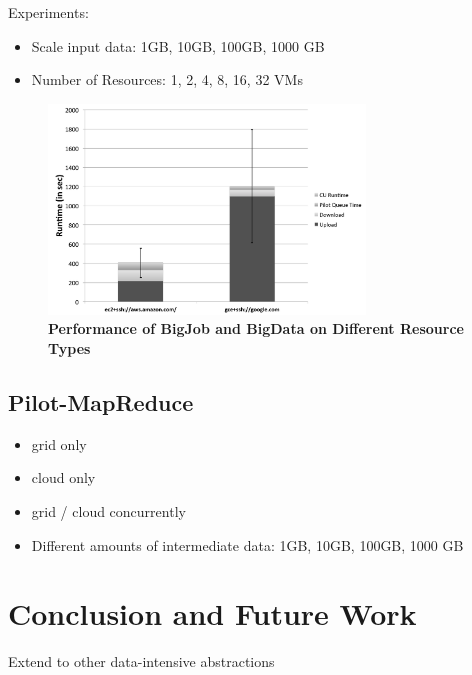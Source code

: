 \documentclass[times]{cpeauth}
\begin{document}
Experiments:
\begin{itemize}
	\item  Scale input data: 1GB, 10GB, 100GB, 1000 GB
	\item  Number of Resources: 1, 2, 4, 8, 16, 32 VMs
\end{itemize}


\begin{figure}[htbp]
	\centering
		\includegraphics[width=0.75\textwidth]{performance/pd_google_aws.pdf}
	\caption{\textbf{Performance of BigJob and BigData on Different Resource Types}}
	\label{fig:performance_pd_google_aws}
\end{figure}




\subsection{Pilot-MapReduce}
\begin{itemize}
	\item grid only
	\item cloud only
	\item grid / cloud concurrently
	\item  Different amounts of intermediate data: 1GB, 10GB, 100GB, 1000 GB	
\end{itemize}

\section{Conclusion and Future Work}

Extend to other data-intensive abstractions



\end{document}
